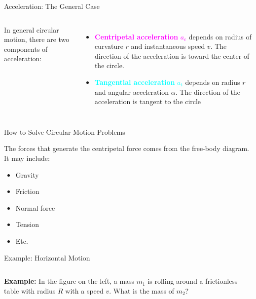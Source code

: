 \documentclass[12pt,compress,aspectratio=169]{beamer}
\begin{document}
\begin{frame}{Acceleration: The General Case}
  \begin{columns}
    
    In general circular motion, there are two components of acceleration:
    \begin{itemize}
    \item\textcolor{magenta}{\textbf{Centripetal acceleration} $a_c$} depends on
      radius of curvature $r$ and instantaneous speed $v$. The direction of
      the acceleration is toward the center of the circle.
    \item \textcolor{cyan}{\textbf{Tangential acceleration} $a_t$}
      depends on radius $r$  and angular acceleration $\alpha$. The direction
      of the acceleration is tangent to the circle
    \end{itemize}
  \end{columns}
\end{frame}



\begin{frame}{How to Solve Circular Motion Problems}
%
  
  The forces that generate the centripetal force comes from the free-body
  diagram. It may include:
  \begin{itemize}
  \item Gravity
  \item Friction
  \item Normal force
  \item Tension
  \item Etc.
  \end{itemize}
\end{frame}



\begin{frame}{Example: Horizontal Motion}
  \begin{columns}
    
    \textbf{Example:} In the figure on the left, a mass $m_1$ is rolling around
    a frictionless table with radius $R$ with a speed $v$. What is the mass of
    $m_2$?
  \end{columns}
\end{frame}
\end{document}
